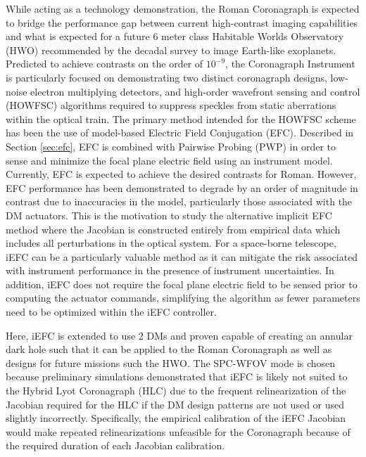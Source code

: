 \documentclass[12pt]{spieman}  %
\begin{document}
\begin{spacing}{2}
While acting as a technology demonstration, the Roman Coronagraph is expected to bridge the performance gap between current high-contrast imaging capabilities and what is expected for a future 6 meter class Habitable Worlds Observatory (HWO) recommended by the decadal survey to image Earth-like exoplanets\cite{astro2020decadal}. Predicted to achieve contrasts on the order of $10^{-9}$,\cite{Bailey-roman-cgi-2023} the Coronagraph Instrument is particularly focused on demonstrating two distinct coronagraph designs, low-noise electron multiplying detectors, and high-order wavefront sensing and control (HOWFSC) algorithms required to suppress speckles from static aberrations within the optical train. The primary method intended for the HOWFSC scheme has been the use of model-based Electric Field Conjugation (EFC)\cite{give'on-bb-wavefront-correction}. Described in Section \ref{sec:efc}, EFC is combined with Pairwise Probing (PWP) in order to sense and minimize the focal plane electric field using an instrument model. Currently, EFC is expected to achieve the desired contrasts for Roman. However, EFC performance has been demonstrated to degrade by an order of magnitude in contrast due to inaccuracies in the model, particularly those associated with the DM actuators\cite{potier-comparing-fpwfs}. This is the motivation to study the alternative implicit EFC method \cite{haffert-iefc} where the Jacobian is constructed entirely from empirical data which includes all perturbations in the optical system. For a space-borne telescope, iEFC can be a particularly valuable method as it can mitigate the risk associated with instrument performance in the presence of instrument uncertainties. In addition, iEFC does not require the focal plane electric field to be sensed prior to computing the actuator commands, simplifying the algorithm as fewer parameters need to be optimized within the iEFC controller\cite{haffert-iefc}.

Here, iEFC is extended to use 2 DMs and proven capable of creating an annular dark hole such that it can be applied to the Roman Coronagraph as well as designs for future missions such the HWO. The SPC-WFOV mode is chosen because preliminary simulations demonstrated that iEFC is likely not suited to the Hybrid Lyot Coronagraph (HLC) due to the frequent relinearization of the Jacobian required for the HLC if the DM design patterns are not used\cite{milani-cgi-iefc-2023} or used slightly incorrectly\cite{zhou-cgi-howfsc-2020}. Specifically, the empirical calibration of the iEFC Jacobian would make repeated relinearizations unfeasible for the Coronagraph because of the required duration of each Jacobian calibration. %


\end{spacing}
\end{document}
